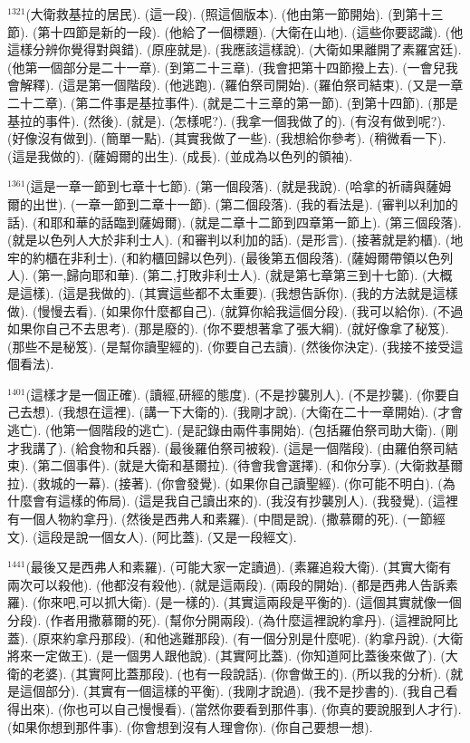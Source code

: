 \documentclass{book}
\begin{document}
$^{1321}$(大衛救基拉的居民).
(這一段).
(照這個版本).
(他由第一節開始).
(到第十三節).
(第十四節是新的一段).
(他給了一個標題).
(大衛在山地).
(這些你要認識).
(他這樣分辨你覺得對與錯).
(原座就是).
(我應該這樣說).
(大衛如果離開了素羅宮廷).
(他第一個部分是二十一章).
(到第二十三章).
(我會把第十四節撥上去).
(一會兒我會解釋).
(這是第一個階段).
(他逃跑).
(羅伯祭司開始).
(羅伯祭司結束).
(又是一章二十二章).
(第二件事是基拉事件).
(就是二十三章的第一節).
(到第十四節).
(那是基拉的事件).
(然後).
(就是).
(怎樣呢?).
(我拿一個我做了的).
(有沒有做到呢?).
(好像沒有做到).
(簡單一點).
(其實我做了一些).
(我想給你參考).
(稍微看一下).
(這是我做的).
(薩姆爾的出生).
(成長).
(並成為以色列的領袖).

$^{1361}$(這是一章一節到七章十七節).
(第一個段落).
(就是我說).
(哈拿的祈禱與薩姆爾的出世).
(一章一節到二章十一節).
(第二個段落).
(我的看法是).
(審判以利加的話).
(和耶和華的話臨到薩姆爾).
(就是二章十二節到四章第一節上).
(第三個段落).
(就是以色列人大於非利士人).
(和審判以利加的話).
(是形言).
(接著就是約櫃).
(地牢的約櫃在非利士).
(和約櫃回歸以色列).
(最後第五個段落).
(薩姆爾帶領以色列人).
(第一,歸向耶和華).
(第二,打敗非利士人).
(就是第七章第三到十七節).
(大概是這樣).
(這是我做的).
(其實這些都不太重要).
(我想告訴你).
(我的方法就是這樣做).
(慢慢去看).
(如果你什麼都自己).
(就算你給我這個分段).
(我可以給你).
(不過如果你自己不去思考).
(那是廢的).
(你不要想著拿了張大綱).
(就好像拿了秘笈).
(那些不是秘笈).
(是幫你讀聖經的).
(你要自己去讀).
(然後你決定).
(我接不接受這個看法).

$^{1401}$(這樣才是一個正確).
(讀經,研經的態度).
(不是抄襲別人).
(不是抄襲).
(你要自己去想).
(我想在這裡).
(講一下大衛的).
(我剛才說).
(大衛在二十一章開始).
(才會逃亡).
(他第一個階段的逃亡).
(是記錄由兩件事開始).
(包括羅伯祭司助大衛).
(剛才我講了).
(給食物和兵器).
(最後羅伯祭司被殺).
(這是一個階段).
(由羅伯祭司結束).
(第二個事件).
(就是大衛和基爾拉).
(待會我會選擇).
(和你分享).
(大衛救基爾拉).
(救城的一幕).
(接著).
(你會發覺).
(如果你自己讀聖經).
(你可能不明白).
(為什麼會有這樣的佈局).
(這是我自己讀出來的).
(我沒有抄襲別人).
(我發覺).
(這裡有一個人物約拿丹).
(然後是西弗人和素羅).
(中間是說).
(撒慕爾的死).
(一節經文).
(這段是說一個女人).
(阿比蓋).
(又是一段經文).

$^{1441}$(最後又是西弗人和素羅).
(可能大家一定讀過).
(素羅追殺大衛).
(其實大衛有兩次可以殺他).
(他都沒有殺他).
(就是這兩段).
(兩段的開始).
(都是西弗人告訴素羅).
(你來吧,可以抓大衛).
(是一樣的).
(其實這兩段是平衡的).
(這個其實就像一個分段).
(作者用撒慕爾的死).
(幫你分開兩段).
(為什麼這裡說約拿丹).
(這裡說阿比蓋).
(原來約拿丹那段).
(和他逃難那段).
(有一個分別是什麼呢).
(約拿丹說).
(大衛將來一定做王).
(是一個男人跟他說).
(其實阿比蓋).
(你知道阿比蓋後來做了).
(大衛的老婆).
(其實阿比蓋那段).
(也有一段說話).
(你會做王的).
(所以我的分析).
(就是這個部分).
(其實有一個這樣的平衡).
(我剛才說過).
(我不是抄書的).
(我自己看得出來).
(你也可以自己慢慢看).
(當然你要看到那件事).
(你真的要說服到人才行).
(如果你想到那件事).
(你會想到沒有人理會你).
(你自己要想一想).
\end{document}
